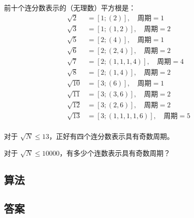 \begin{tcolorbox}[breakable]
	前十个连分数表示的（无理数）平方根是：
	\begin{align*}
		\sqrt{2}  & = [1; (2)], \quad \text{周期} = 1             \\
		\sqrt{3}  & = [1; (1, 2)], \quad \text{周期} = 2          \\
		\sqrt{5}  & = [2; (4)], \quad \text{周期} = 1             \\
		\sqrt{6}  & = [2; (2, 4)], \quad \text{周期} = 2          \\
		\sqrt{7}  & = [2; (1, 1, 1, 4)], \quad \text{周期} = 4    \\
		\sqrt{8}  & = [2; (1, 4)], \quad \text{周期} = 2          \\
		\sqrt{10} & = [3; (6)], \quad \text{周期} = 1             \\
		\sqrt{11} & = [3; (3, 6)], \quad \text{周期} = 2          \\
		\sqrt{12} & = [3; (2, 6)], \quad \text{周期} = 2          \\
		\sqrt{13} & = [3; (1, 1, 1, 1, 6)], \quad \text{周期} = 5 \\
	\end{align*}

	对于 $\sqrt{N} \leq 13$，正好有四个连分数表示具有奇数周期。

	对于 $\sqrt{N} \leq 10000$，有多少个连数表示具有奇数周期？

\end{tcolorbox}

\subsection{算法}

\subsection{答案}

